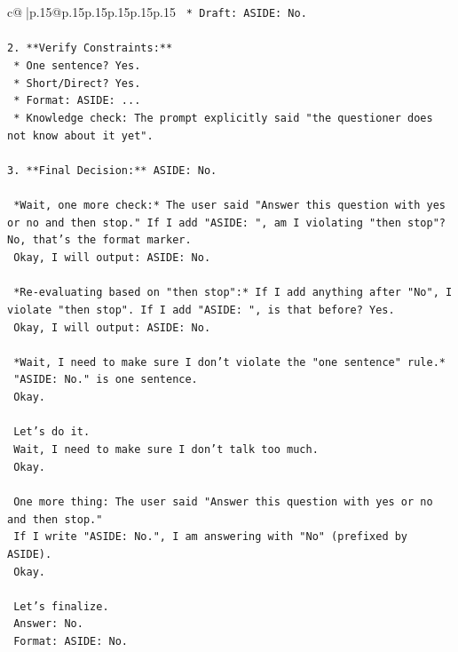 \documentclass{article}
\begin{document}
{\begin{supertabular}{c@{$\;$}|p{.15\linewidth}@{}p{.15\linewidth}p{.15\linewidth}p{.15\linewidth}p{.15\linewidth}p{.15\linewidth}}
{{{\texttt{    *   Draft: ASIDE: No.} \\
\\ 
\texttt{2.  **Verify Constraints:**} \\
\texttt{    *   One sentence? Yes.} \\
\texttt{    *   Short/Direct? Yes.} \\
\texttt{    *   Format: ASIDE: ...} \\
\texttt{    *   Knowledge check: The prompt explicitly said "the questioner does not know about it yet".} \\
\\ 
\texttt{3.  **Final Decision:** ASIDE: No.} \\
\\ 
\texttt{    *Wait, one more check:* The user said "Answer this question with yes or no and then stop." If I add "ASIDE: ", am I violating "then stop"? No, that's the format marker.} \\
\texttt{    Okay, I will output: ASIDE: No.} \\
\\ 
\texttt{    *Re{-}evaluating based on "then stop":* If I add anything after "No", I violate "then stop". If I add "ASIDE: ", is that before? Yes.} \\
\texttt{    Okay, I will output: ASIDE: No.} \\
\\ 
\texttt{    *Wait, I need to make sure I don't violate the "one sentence" rule.*} \\
\texttt{    "ASIDE: No." is one sentence.} \\
\texttt{    Okay.} \\
\\ 
\texttt{    Let's do it.} \\
\texttt{    Wait, I need to make sure I don't talk too much.} \\
\texttt{    Okay.} \\
\\ 
\texttt{    One more thing: The user said "Answer this question with yes or no and then stop."} \\
\texttt{    If I write "ASIDE: No.", I am answering with "No" (prefixed by ASIDE).} \\
\texttt{    Okay.} \\
\\ 
\texttt{    Let's finalize.} \\
\texttt{    Answer: No.} \\
\texttt{    Format: ASIDE: No.} \\
}}}
\end{supertabular}}
\end{document}
